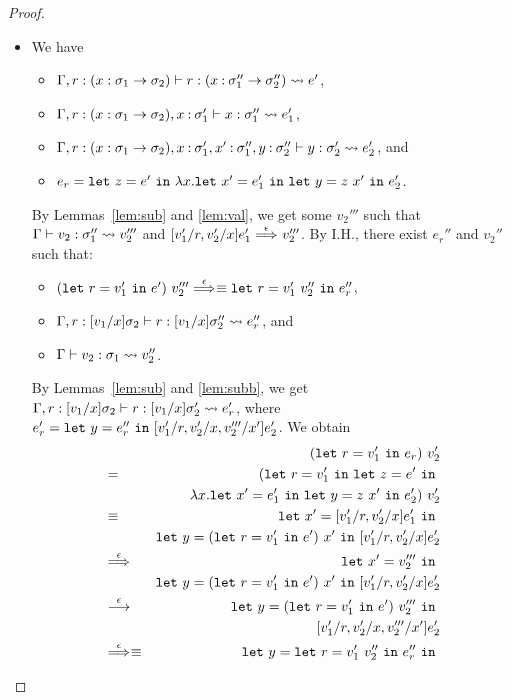 \begin{proof}
\begin{itemize}
\item[] 
We have
\begin{itemize}
\item \(\Gamma,r:(x:\sigma_1 \to \sigma_2) \vdash r : (x\mathbin{:}\sigma''_1\to\sigma''_2) \leadsto e'\),
\item \(\Gamma,r:(x:\sigma_1 \to \sigma_2),x\mathbin{:}\sigma_1' \vdash x : \sigma''_1 \leadsto e_1'\),
\item \(\Gamma,r:(x:\sigma_1 \to \sigma_2),x\mathbin{:}\sigma_1',x'\mathbin{:}\sigma''_1,y\mathbin{:}\sigma''_2 \vdash y : \sigma'_2 \leadsto e_2'\), and
\item \(e_r=\mathtt{let~}z=e'\mathtt{~in~}\lambda x.\mathtt{let~}x'=e_1'\mathtt{~in~}\mathtt{let~}y=z\ x'\mathtt{~in~}e_2'\).
\end{itemize}
By Lemmas~\ref{lem:sub} and \ref{lem:val}, we get some \(v_2'''\) such that
\(\Gamma \vdash v_2 : \sigma_1'' \leadsto v_2'''\) and \([v_1'/r,v_2'/x]e_1' \stackrel{\epsilon}{\Longrightarrow}_{} v_2'''\).
%
By I.H., there exist \(e_r''\) and \(v_2''\) such that:
\begin{itemize}
\item \((\mathtt{let~}r=v_1'\mathtt{~in~}{e'})\ v_2''' \stackrel{\epsilon}{\Longrightarrow}_{}\equiv \mathtt{let~}r=v_1'\ v_2''\mathtt{~in~}e_r''\),
\item \(\Gamma,r:[v_1/x]\sigma_2 \vdash r : [v_1/x]\sigma_2'' \leadsto e_r''\), and
\item \(\Gamma \vdash v_2 : \sigma_1 \leadsto v_2''\).
\end{itemize}
By Lemmas~\ref{lem:sub} and \ref{lem:subb}, we get
\(\Gamma,r:[v_1/x]\sigma_2 \vdash r : [v_1/x]\sigma_2' \leadsto e_r'\), where
\(e_r'=\mathtt{let~}y=e_r''\mathtt{~in~}[v_1'/r,v_2'/x,v_2'''/x']e_2'\).
%
We obtain
\begin{eqnarray*}
&&(\LETEQIN{r}{v_1'}{e_r})\ v_2' \\
&=&(\LETEQIN{r}{v_1'}\LETEQIN{z}{e'} \\
&&\lambda x.\LETEQIN{x'}{e_1'}\LETEQIN{y}{z\ x'}e_2')\ v_2' \\
&\equiv&\LETEQIN{x'}{[v_1'/r,v_2'/x]e_1'} \\
&&\LETEQIN{y}{(\LETEQIN{r}{v_1'}e')\ x'}[v_1'/r,v_2'/x]e_2' \\
&\redswith{\epsilon}{}&\LETEQIN{x'}{v_2'''} \\
&&\LETEQIN{y}{(\LETEQIN{r}{v_1'}e')\ x'}[v_1'/r,v_2'/x]e_2' \\
&\redwith{\epsilon}{}&\LETEQIN{y}{(\LETEQIN{r}{v_1'}e')\ v_2'''} \\
&&[v_1'/r,v_2'/x,v_2'''/x']e_2' \\
&\redswith{\epsilon}{}\equiv&\LETEQIN{y}{\LETEQIN{r}{v_1'\ v_2''}e_r''} \\

\end{eqnarray*}
\end{itemize}
\end{proof}
